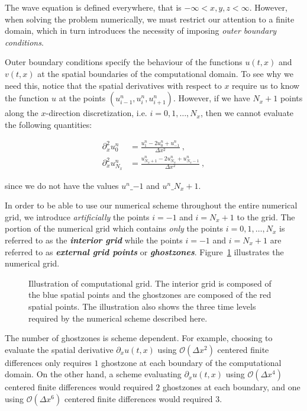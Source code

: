 \documentclass[a4paper,11pt]{article}
\begin{document}
The wave equation is defined everywhere, that is $-\infty<x,y,z<\infty$. However, when solving the problem numerically, we must restrict our attention to a finite domain, which in turn introduces the necessity of imposing \emph{outer boundary conditions}.

Outer boundary conditions specify the behaviour of the functions $u(t,x)$ and $v(t,x)$ at the spatial boundaries of the computational domain. To see why we need this, notice that the spatial derivatives with respect to $x$ require us to know the function $u$ at the points $\left(u_{i-1}^{n},u_{i}^{n},u_{i+1}^{n}\right)$. However, if we have $N_{x}+1$ points along the $x$-direction discretization, i.e. $i=0,1,\dots,N_{x}$, then we cannot evaluate the following quantities:

\begin{equation}
\begin{aligned}
\partial_{x}^{2}u^{n}_{0} &= \frac{u^{n}_{1} - 2u^{n}_{0} + u^{n}_{-1}}{\Delta x^{2}}\ ,\\
\partial_{x}^{2}u^{n}_{N_{x}} &= \frac{u^{n}_{N_{x}+1} - 2u^{n}_{N_{x}} + u^{n}_{N_{x}-1}}{\Delta x^{2}}\ ,
\end{aligned}
\end{equation}

\noindent since we do not have the values $u^{n}\_{-1}$ and $u^{n}\_{N_{x}+1}$.

In order to be able to use our numerical scheme throughout the entire numerical grid, we introduce \emph{artificially} the points $i=-1$ and $i=N_{x}+1$ to the grid. The portion of the numerical grid which contains \emph{only} the points $i=0,1,\dots,N_{x}$ is referred to as the \emph{\textbf{interior grid}} while the points $i=-1$ and $i=N_{x}+1$ are referred to as \emph{\textbf{external grid points}}  or \emph{\textbf{ghostzones}}. Figure~\ref{Figure1} illustrates the numerical grid.

\begin{figure}[ht]
\centering

\caption{Illustration of computational grid. The interior grid is composed of the blue spatial points and the ghostzones are composed of the red spatial points. The illustration also shows the three time levels required by the numerical scheme described here.}
\label{Figure1}
\end{figure}

The number of ghostzones is scheme dependent. For example, choosing to evaluate the spatial derivative $\partial_{x}u(t,x)$ using $\mathcal{O}\left(\Delta x^{2}\right)$ centered finite differences only requires $1$ ghostzone at each boundary of the computational domain. On the other hand, a scheme evaluating $\partial_{x}u(t,x)$ using $\mathcal{O}\left(\Delta x^{4}\right)$ centered finite differences would required $2$ ghostzones at each boundary, and one using $\mathcal{O}\left(\Delta x^{6}\right)$ centered finite differences would required $3$.
\end{document}
